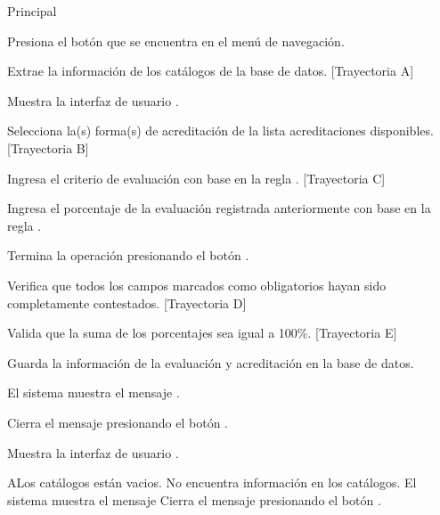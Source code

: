 \begin{UCtrayectoria}{Principal}

	\UCpaso[\UCactor] Presiona el botón  que se encuentra en el menú de navegación.
       
    \UCpaso Extrae la información de los catálogos de la base de datos. [Trayectoria A]
    
    \UCpaso Muestra la interfaz de usuario .

    \UCpaso[\UCactor] Selecciona la(s) forma(s) de acreditación de la lista acreditaciones disponibles. [Trayectoria B]
    
    \UCpaso[\UCactor] Ingresa el criterio de evaluación con base en la regla . [Trayectoria C]
    
    \UCpaso[\UCactor] Ingresa el porcentaje de la evaluación registrada anteriormente con base en la regla .
    
    \UCpaso[\UCactor] Termina la operación presionando el botón .    
        
    \UCpaso Verifica que todos los campos marcados como obligatorios hayan sido completamente contestados. [Trayectoria D]
    
    \UCpaso Valida que la suma de los porcentajes sea igual a 100\%. [Trayectoria E]
    
    \UCpaso Guarda la información de la evaluación y acreditación en la base de datos.
    
    \UCpaso El sistema muestra el mensaje .
    
    \UCpaso[\UCactor] Cierra el mensaje presionando el botón .
    
    \UCpaso Muestra la interfaz de usuario .
\end{UCtrayectoria}


\begin{UCtrayectoriaA}{A}{Los catálogos están vacios.}
	\UCpaso No encuentra información en los catálogos.
    \UCpaso El sistema muestra el mensaje 
    \UCpaso[\UCactor] Cierra el mensaje presionando el botón .
\end{UCtrayectoriaA}

